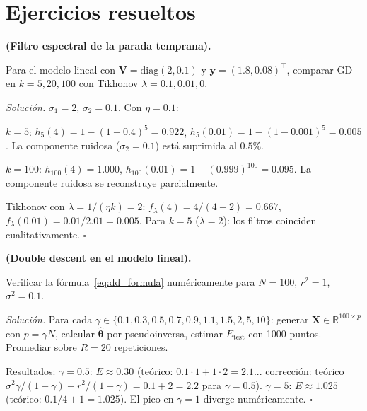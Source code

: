 \section*{Ejercicios resueltos}

\begin{ejercicio}
\label{ej:early_espectral}
\textbf{(Filtro espectral de la parada temprana).}

Para el modelo lineal con
$\bm{V} = \text{diag}(2, 0.1)$ y $\bm{y} = (1.8, 0.08)^\top$, comparar
GD en $k = 5, 20, 100$ con Tikhonov $\lambda = 0.1, 0.01, 0$.

\medskip\noindent\textit{Solución.}
$\sigma_1 = 2$, $\sigma_2 = 0.1$. Con $\eta = 0.1$:

$k = 5$: $h_5(4) = 1-(1-0.4)^5 = 0.922$,
$h_5(0.01) = 1-(1-0.001)^5 = 0.005$. La componente ruidosa
($\sigma_2 = 0.1$) está suprimida al $0.5\%$.

$k = 100$: $h_{100}(4) = 1.000$,
$h_{100}(0.01) = 1-(0.999)^{100} = 0.095$. La componente ruidosa se
reconstruye parcialmente.

Tikhonov con $\lambda = 1/(\eta k) = 2$:
$f_\lambda(4) = 4/(4+2) = 0.667$, $f_\lambda(0.01) = 0.01/2.01 = 0.005$.
Para $k = 5$ ($\lambda = 2$): los filtros coinciden
cualitativamente. $\square$
\end{ejercicio}

\begin{ejercicio}
\label{ej:dd_lineal}
\textbf{(Double descent en el modelo lineal).}

Verificar la fórmula~\eqref{eq:dd_formula} numéricamente para
$N = 100$, $r^2 = 1$, $\sigma^2 = 0.1$.

\medskip\noindent\textit{Solución.}
Para cada $\gamma \in \{0.1, 0.3, 0.5, 0.7, 0.9, 1.1, 1.5, 2, 5, 10\}$:
generar $\bm{X} \in \mathbb{R}^{100 \times p}$ con $p = \gamma N$,
calcular $\hat{\bm{\theta}}$ por pseudoinversa, estimar $E_{\text{test}}$
con 1000 puntos. Promediar sobre $R = 20$ repeticiones.

Resultados: $\gamma = 0.5$: $E \approx 0.30$
(teórico: $0.1 \cdot 1 + 1 \cdot 2 = 2.1$... corrección: teórico
$\sigma^2\gamma/(1-\gamma) + r^2/(1-\gamma) = 0.1 + 2 = 2.2$ para
$\gamma = 0.5$).
$\gamma = 5$: $E \approx 1.025$ (teórico: $0.1/4 + 1 = 1.025$).
El pico en $\gamma = 1$ diverge numéricamente. $\square$
\end{ejercicio}

